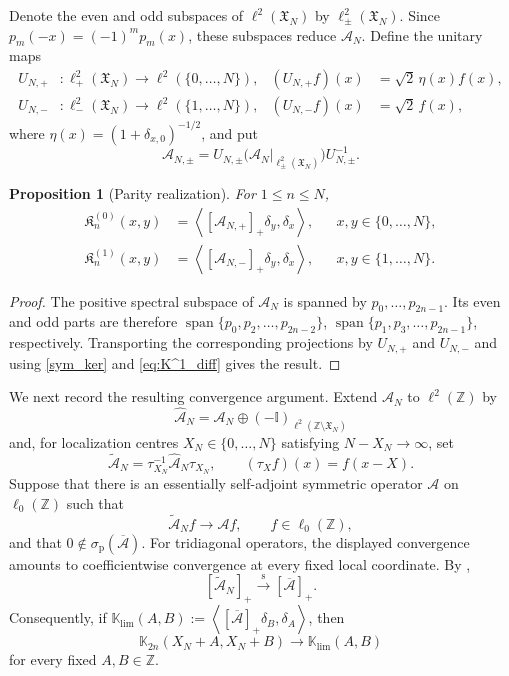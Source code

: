 \documentclass[reqno,11pt]{amsart}
\newcommand{\Span}{\operatorname{span}}
\newcommand{\II}{\mathbb{I}}
\newcommand{\ZZ}{\mathbb{Z}}
\theoremstyle{plain}
\newtheorem{prop}[thm]{Proposition}
\theoremstyle{definition}
\numberwithin{equation}{section}
\begin{document}
Denote the even and odd subspaces of $\ell^2(\mathfrak X_N)$ by $\ell^2_\pm(\mathfrak X_N)$. Since $p_m(-x)=(-1)^mp_m(x)$, these subspaces reduce $\mathcal A_N$. Define the unitary maps
\[
\begin{aligned}
U_{N,+}&:
\ell^2_+(\mathfrak X_N)
\longrightarrow
\ell^2(\{0,\ldots,N\}),
&
(U_{N,+}f)(x)&=
\sqrt2\,\eta(x)f(x),\\
U_{N,-}&:
\ell^2_-(\mathfrak X_N)
\longrightarrow
\ell^2(\{1,\ldots,N\}),
&
(U_{N,-}f)(x)&=
\sqrt2\,f(x),
\end{aligned}
\]
where $\eta(x)=(1+\delta_{x,0})^{-1/2}$, and put
\[
\mathcal A_{N,\pm} =
U_{N,\pm}
\bigl(
\mathcal A_N|_{\ell^2_\pm(\mathfrak X_N)}
\bigr)
U_{N,\pm}^{-1}.
\]

\begin{prop}[Parity realization]
\label{prop:spectral_first_christoffel}
For $1\leq n\leq N$,
\[
\begin{aligned}
\mathfrak K_n^{(0)}(x,y)
&=
\left\langle
[\mathcal A_{N,+}]_+\delta_y,\delta_x
\right\rangle,
&&
x,y\in\{0,\ldots,N\},\\
\mathfrak K_n^{(1)}(x,y)
&=
\left\langle
[\mathcal A_{N,-}]_+\delta_y,\delta_x
\right\rangle,
&&
x,y\in\{1,\ldots,N\}.
\end{aligned}
\]
\end{prop}

\begin{proof}
The positive spectral subspace of $\mathcal A_N$ is spanned by $p_0,\ldots,p_{2n-1}$. Its even and odd parts are therefore $\Span\{p_0,p_2,\ldots,p_{2n-2}\}$, $\Span\{p_1,p_3,\ldots,p_{2n-1}\}$, respectively. Transporting the corresponding projections by $U_{N,+}$ and $U_{N,-}$ and using \eqref{sym_ker} and \eqref{eq:K^1_diff} gives the result.
\end{proof}

We next record the resulting convergence argument. Extend $\mathcal A_N$ to $\ell^2(\ZZ)$ by
\[
\widehat{\mathcal A}_N =
\mathcal A_N
\oplus
(-\II)_{\ell^2(\ZZ\setminus\mathfrak X_N)}
\]
and, for localization centres $X_N\in\{0,\ldots,N\}$ satisfying $N-X_N\to\infty$, set
\[
\widetilde{\mathcal A}_N =
\tau_{X_N}^{-1}
\widehat{\mathcal A}_N
\tau_{X_N},
\qquad
(\tau_Xf)(x)=f(x-X).
\]
Suppose that there is an essentially self-adjoint symmetric operator ${\mathcal A}$ on $\ell_{0}(\ZZ)$ such that
\[
\widetilde{\mathcal A}_Nf
\longrightarrow
{\mathcal A}f,
\qquad
f\in \ell_{0}(\ZZ),
\]
and that $0\notin\sigma_{\mathrm p}(\overline{{\mathcal A}})$. For tridiagonal operators, the displayed convergence amounts to coefficientwise convergence at every fixed local coordinate. By \cite[Propositions~4.2 and~4.3]{Borodin_2017},
\[
[\widetilde{\mathcal A}_N]_+
\xrightarrow{\mathrm s}
[\overline{{\mathcal A}}]_+.
\]
Consequently, if $\mathbb K_{\lim}(A,B) :=
\left\langle
[\overline{{\mathcal A}}]_+\delta_B,\delta_A
\right\rangle$, then
\[
\mathbb K_{2n}(X_N+A,X_N+B)
\longrightarrow
\mathbb K_{\lim}(A,B)
\]
for every fixed $A,B\in\ZZ$.
\end{document}
